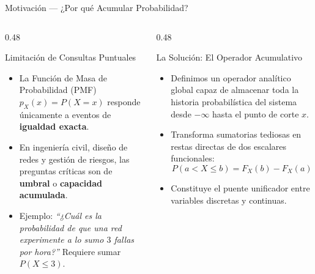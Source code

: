 \documentclass[10pt, aspectratio=169]{beamer}
\begin{document}
\begin{frame}{Motivación — ¿Por qué Acumular Probabilidad?}
  \begin{columns}[T]
    \begin{column}{0.48\textwidth}
      \begin{block}{Limitación de Consultas Puntuales}
        \small
        \begin{itemize}\itemsep=0.1cm
          \item La Función de Masa de Probabilidad (PMF) $p_X(x) = P(X=x)$ responde únicamente a eventos de \textbf{igualdad exacta}.
          \item En ingeniería civil, diseño de redes y gestión de riesgos, las preguntas críticas son de \textbf{umbral} o \textbf{capacidad acumulada}.
          \item Ejemplo: \emph{``¿Cuál es la probabilidad de que una red experimente a lo sumo $3$ fallas por hora?''} Requiere sumar $P(X \le 3)$.
        \end{itemize}
      \end{block}
    \end{column}
    \begin{column}{0.48\textwidth}
      \begin{alertblock}{La Solución: El Operador Acumulativo}
        \small
        \begin{itemize}\itemsep=0.1cm
          \item Definimos un operador analítico global capaz de almacenar toda la historia probabilística del sistema desde $-\infty$ hasta el punto de corte $x$.
          \item Transforma sumatorias tediosas en restas directas de dos escalares funcionales:
          $$P(a < X \le b) = F_X(b) - F_X(a)$$
          \item Constituye el puente unificador entre variables discretas y continuas.
        \end{itemize}
      \end{alertblock}
    \end{column}
  \end{columns}
\end{frame}
\end{document}
